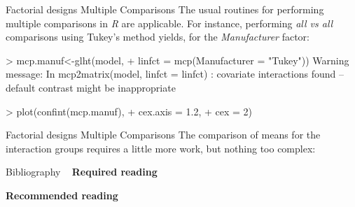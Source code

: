 \documentclass[t]{beamer}
\begin{document}

\begin{ftstf}
{Factorial designs}
{Multiple Comparisons}
The usual routines for performing multiple comparisons in \textit{R} are applicable. For instance, performing \textit{all vs all} comparisons using Tukey's method yields, for the \textit{Manufacturer} factor:
\vhalf
\begin{rcode}
> mcp.manuf<-glht(model,
+                 linfct = mcp(Manufacturer = "Tukey"))
Warning message:
In mcp2matrix(model, linfct = linfct) :
  covariate interactions found 
  -- default contrast might be inappropriate

> plot(confint(mcp.manuf),
+      cex.axis   = 1.2,
+      cex        = 2)
\end{rcode}
\end{ftstf}


\begin{ftstf}
{Factorial designs}
{Multiple Comparisons}
The comparison of means for the interaction groups requires a little more work, but nothing too complex:
\vhalf
\begin{rcode}

\end{rcode}
\end{ftstf}


\begin{ftst}
{Bibliography}
{\ }
\scriptsize
\textbf{Required reading}

\benums %
\item 
\eenum

\textbf{Recommended reading}
\benums 
\item 
\eenum
\end{ftst}
\end{document}
